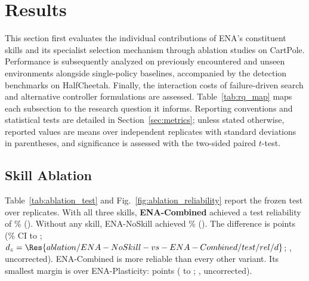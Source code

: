 \section{Results}
\label{sec:results}

This section first evaluates the individual contributions of ENA's constituent skills and its specialist selection mechanism through ablation studies on CartPole. Performance is subsequently analyzed on previously encountered and unseen environments alongside single-policy baselines, accompanied by the detection benchmarks on HalfCheetah. Finally, the interaction costs of failure-driven search and alternative controller formulations are assessed. Table~\ref{tab:rq_map} maps each subsection to the research question it informs. Reporting conventions and statistical tests are detailed in Section~\ref{sec:metrics}; unless stated otherwise, reported values are means over independent replicates with standard deviations in parentheses, and significance is assessed with the two-sided paired $t$-test.

\subsection{Skill Ablation}
\label{sec:ablation}
Table~\ref{tab:ablation_test} and Fig.~\ref{fig:ablation_reliability} report the frozen test over  replicates. With all three skills, \textbf{ENA-Combined} achieved a test reliability of \% (). Without any skill, ENA-NoSkill achieved \% (). The difference is  points (\% CI  to ; $d_z = \Res{ablation/ENA-NoSkill-vs-ENA-Combined/test/rel/d}$; , uncorrected). ENA-Combined is more reliable than every other variant. Its smallest margin is over ENA-Plasticity:  points ( to ; , uncorrected).

